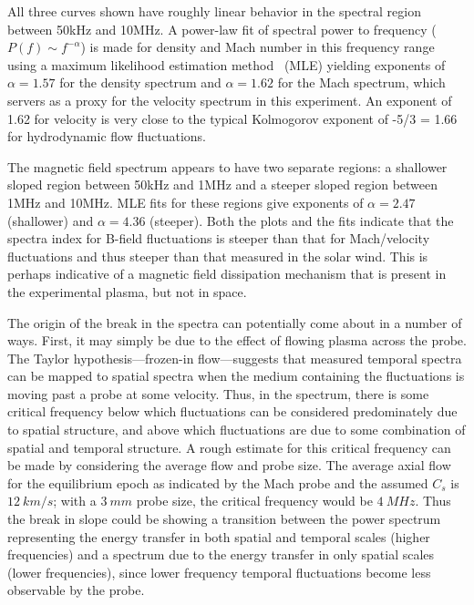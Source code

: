 \documentclass[12pt]{iopart}
\begin{document}
All three curves shown have roughly linear behavior in the spectral region between 50kHz and 10MHz. A power-law fit of spectral power to frequency ($P(f) \sim f^{-\alpha}$) is made for density and Mach number in this frequency range using a maximum likelihood estimation method~\cite{clauset09} (MLE) yielding exponents of $\alpha = 1.57$ for the density spectrum and $\alpha = 1.62$ for the Mach spectrum, which servers as a proxy for the velocity spectrum in this experiment. An exponent of 1.62 for velocity is very close to the typical Kolmogorov exponent of -5/3 = 1.66 for hydrodynamic flow fluctuations.

The magnetic field spectrum appears to have two separate regions: a shallower sloped region between 50kHz and 1MHz and a steeper sloped region between 1MHz and 10MHz. MLE fits for these regions give exponents of $\alpha = 2.47$ (shallower) and $\alpha = 4.36$ (steeper). Both the plots and the fits indicate that the spectra index for B-field fluctuations is steeper than that for Mach/velocity fluctuations and thus steeper than that measured in the solar wind. This is perhaps indicative of a magnetic field dissipation mechanism that is present in the experimental plasma, but not in space.

The origin of the break in the spectra can potentially come about in a number of ways. First, it may simply be due to the effect of flowing plasma across the probe. The Taylor hypothesis---frozen-in flow---suggests that measured temporal spectra can be mapped to spatial spectra when the medium containing the fluctuations is moving past a probe at some velocity. Thus, in the spectrum, there is some critical frequency below which fluctuations can be considered predominately due to spatial structure, and above which fluctuations are due to some combination of spatial and temporal structure. A rough estimate for this critical frequency can be made by considering the average flow and probe size. The average axial flow for the equilibrium epoch as indicated by the Mach probe and the assumed $C_{s}$ is $12~km/s$; with a $3~mm$ probe size, the critical frequency would be $4~MHz$. Thus the break in slope could be showing a transition between the power spectrum representing the energy transfer in both spatial and temporal scales (higher frequencies) and a spectrum due to the energy transfer in only spatial scales (lower frequencies), since lower frequency temporal fluctuations become less observable by the probe. 
\end{document}
